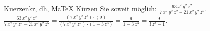 \begin{MAufgabe}{Kuerzen}{kr, dh, MaTeX}
K\"urzen Sie soweit m\"oglich: $\frac{63\, x^2\, y^2\, z^2}{7\, x^2\, y^2\, z^2 - 21\, x^2\, y^2\, z^5}$.\\ 
\ifLsg\MLoesung
\quad $\frac{63\, x^2\, y^2\, z^2}{7\, x^2\, y^2\, z^2 - 21\, x^2\, y^2\, z^5}=\frac{(7\, x^2\, y^2\, z^2)\cdot(9)}{(7\, x^2\, y^2\, z^2)\cdot(1 - 3\, z^3)}=\frac{9}{1 - 3\, z^3}=\frac{-9}{3\, z^3 - 1}$.\else\relax\fi
 \end{MAufgabe}